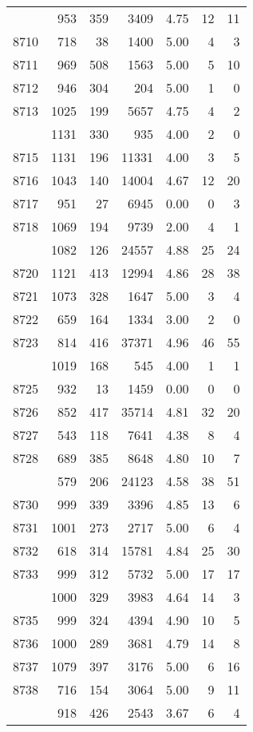 \documentclass[
]{article}
\begin{document}
\begin{table}
\begin{tabular}[t]{lrrrrrr}
\addlinespace
8709 & 953 & 359 & 3409 & 4.75 & 12 & 11\\
8710 & 718 & 38 & 1400 & 5.00 & 4 & 3\\
8711 & 969 & 508 & 1563 & 5.00 & 5 & 10\\
8712 & 946 & 304 & 204 & 5.00 & 1 & 0\\
8713 & 1025 & 199 & 5657 & 4.75 & 4 & 2\\
\addlinespace
8714 & 1131 & 330 & 935 & 4.00 & 2 & 0\\
8715 & 1131 & 196 & 11331 & 4.00 & 3 & 5\\
8716 & 1043 & 140 & 14004 & 4.67 & 12 & 20\\
8717 & 951 & 27 & 6945 & 0.00 & 0 & 3\\
8718 & 1069 & 194 & 9739 & 2.00 & 4 & 1\\
\addlinespace
8719 & 1082 & 126 & 24557 & 4.88 & 25 & 24\\
8720 & 1121 & 413 & 12994 & 4.86 & 28 & 38\\
8721 & 1073 & 328 & 1647 & 5.00 & 3 & 4\\
8722 & 659 & 164 & 1334 & 3.00 & 2 & 0\\
8723 & 814 & 416 & 37371 & 4.96 & 46 & 55\\
\addlinespace
8724 & 1019 & 168 & 545 & 4.00 & 1 & 1\\
8725 & 932 & 13 & 1459 & 0.00 & 0 & 0\\
8726 & 852 & 417 & 35714 & 4.81 & 32 & 20\\
8727 & 543 & 118 & 7641 & 4.38 & 8 & 4\\
8728 & 689 & 385 & 8648 & 4.80 & 10 & 7\\
\addlinespace
8729 & 579 & 206 & 24123 & 4.58 & 38 & 51\\
8730 & 999 & 339 & 3396 & 4.85 & 13 & 6\\
8731 & 1001 & 273 & 2717 & 5.00 & 6 & 4\\
8732 & 618 & 314 & 15781 & 4.84 & 25 & 30\\
8733 & 999 & 312 & 5732 & 5.00 & 17 & 17\\
\addlinespace
8734 & 1000 & 329 & 3983 & 4.64 & 14 & 3\\
8735 & 999 & 324 & 4394 & 4.90 & 10 & 5\\
8736 & 1000 & 289 & 3681 & 4.79 & 14 & 8\\
8737 & 1079 & 397 & 3176 & 5.00 & 6 & 16\\
8738 & 716 & 154 & 3064 & 5.00 & 9 & 11\\
\addlinespace
8739 & 918 & 426 & 2543 & 3.67 & 6 & 4\\

\end{tabular}
\end{table}
\end{document}
